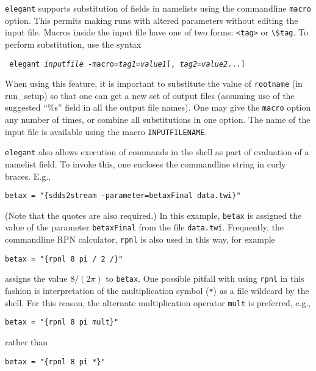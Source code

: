 \documentclass[11pt]{article}
\begin{document}
{\tt elegant} supports substitution of fields in namelists using the
commandline {\tt macro} option.  This permits making runs with altered
parameters without editing the input file.  Macros inside the input
file have one of two forms: \verb|<tag>| or \verb|\$tag|.  To perform
substitution, use the syntax
\begin{flushleft}{\tt
elegant {\em inputfile} -macro={\em tag1}={\em value1}[,{\em
tag2}={\em value2}...]  }\end{flushleft} When using this feature, it
is important to substitute the value of {\tt rootname} (in run\_setup)
so that one can get a new set of output files (assuming use of the
suggested ``\%s'' field in all the output file names).
One may give the {\tt macro} option any number of times, or combine
all substitutions in one option.  The name of the input file is available
using the macro \verb|INPUTFILENAME|.

{\tt elegant} also allows execution of commands in the shell as part of
evaluation of a namelist field.  To invoke this, one encloses the commandline
string in curly braces.  E.g., 
\begin{verbatim}
betax = "{sdds2stream -parameter=betaxFinal data.twi}"
\end{verbatim}
(Note that the quotes are also required.)
In this example, \verb|betax| is assigned the value of the parameter {\tt betaxFinal} from
the file {\tt data.twi}.
Frequently, the commandline RPN calculator, {\tt rpnl} is also used in this way, for example
\begin{verbatim}
betax = "{rpnl 8 pi / 2 /}"
\end{verbatim}
assigns the value $8/(2 \pi)$ to {\tt betax}. One possible pitfall with using \verb|rpnl| in this
fashion is interpretation of the multiplication symbol (\verb|*|) as a file wildcard by the
shell.  For this reason, the alternate multiplication operator \verb|mult| is preferred, e.g.,
\begin{verbatim}
betax = "{rpnl 8 pi mult}"
\end{verbatim}
rather than
\begin{verbatim}
betax = "{rpnl 8 pi *}"
\end{verbatim}
\end{document}
